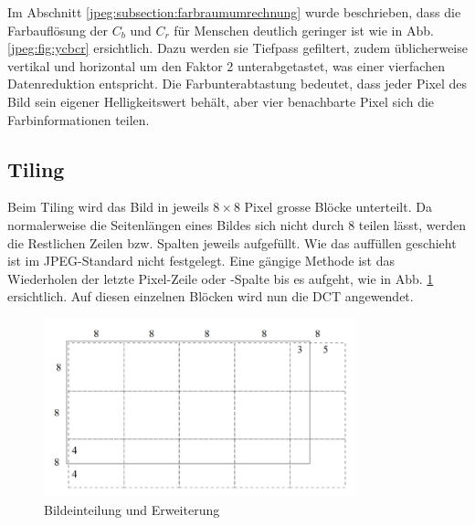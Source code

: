 Im Abschnitt \ref{jpeg:subsection:farbraumumrechnung} wurde beschrieben, dass die Farbauflösung der \(C_b\) und \(C_r\) für Menschen deutlich geringer ist wie in Abb. \ref{jpeg:fig:ycbcr} ersichtlich.
Dazu werden sie Tiefpass gefiltert, zudem üblicherweise vertikal und horizontal um den Faktor 2 unterabgetastet, was einer vierfachen Datenreduktion entspricht.
Die Farbunterabtastung bedeutet, dass jeder Pixel des Bild sein eigener Helligkeitswert behält, aber vier benachbarte Pixel sich die Farbinformationen teilen. 

\subsection{Tiling
\label{jpeg:subsection:tiling}}
Beim Tiling wird das Bild in jeweils \(8\times8\) Pixel grosse Blöcke unterteilt.
Da normalerweise die Seitenlängen eines Bildes sich nicht durch 8 teilen lässt, werden die Restlichen Zeilen bzw. Spalten jeweils aufgefüllt.
Wie das auffüllen geschieht ist im JPEG-Standard nicht festgelegt.
Eine gängige Methode ist das Wiederholen der letzte Pixel-Zeile oder -Spalte bis es aufgeht, wie in Abb. \ref{jpeg:fig:tiling} ersichtlich.
Auf diesen einzelnen Blöcken wird nun die DCT angewendet.

\begin{figure}
    \centering
    \includegraphics[width=90mm]{papers/jpeg/pictures/unterteilung.pdf}
    \caption{Bildeinteilung und Erweiterung
        \label{jpeg:fig:tiling}}
\end{figure}

